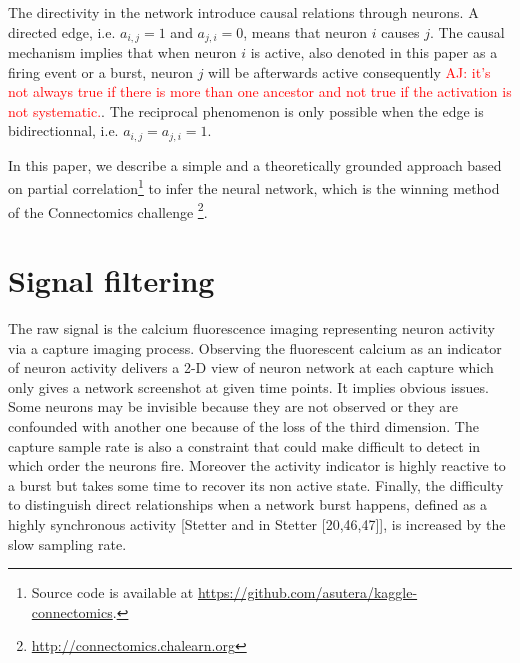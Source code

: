 \documentclass[wcp]{jmlr}
\begin{document}
The directivity in the network introduce causal relations through neurons. A
directed edge, i.e. $a_{i,j} = 1$ and $a_{j,i} = 0$, means that neuron $i$
causes $j$. The causal mechanism implies that when neuron $i$ is active, also
denoted in this paper as a firing event or a burst, neuron $j$ will be
afterwards active consequently \textcolor{red}{AJ: it's not always true if
there is more than one ancestor and not true if the activation is not
systematic.}. The
reciprocal phenomenon is only possible
when the edge is bidirectionnal, i.e. $a_{i,j} = a_{j,i} = 1$.

In this paper, we describe a simple and a theoretically grounded approach
based on partial correlation\footnote{Source code is available at
\url{https://github.com/asutera/kaggle-connectomics}.} to infer the neural
network, which is the winning method of the Connectomics challenge
\footnote{\url{http://connectomics.chalearn.org}}.


\section{Signal filtering} \label{sec:filter}




The raw signal is the calcium fluorescence imaging representing neuron
activity via a capture imaging process. Observing the fluorescent calcium as
an indicator of neuron activity delivers a 2-D view of neuron network at each
capture which only gives a network screenshot at given time points. It implies
obvious issues. Some neurons may be invisible because they are not observed or
they are confounded with another one because of the loss of the third
dimension. The capture sample rate is also a constraint that could make
difficult to detect in which order the neurons fire.  Moreover the activity
indicator is highly reactive to a burst but takes some time to recover its non
active state.  Finally, the difficulty to distinguish direct relationships when
 a network burst happens, defined as a highly synchronous activity
 [Stetter and in Stetter [20,46,47]], is increased by the slow sampling rate.
\end{document}
